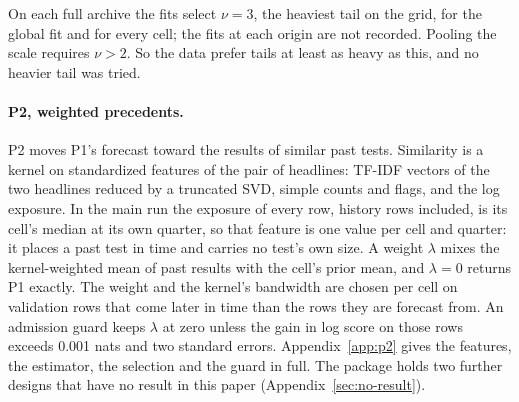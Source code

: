 \documentclass[sigconf,nonacm]{acmart}
\begin{document}
On each full archive the fits select $\nu = 3$, the heaviest tail on the grid, for the global fit and for every cell; the fits at each origin are not recorded. Pooling the scale requires $\nu > 2$. So the data prefer tails at least as heavy as this, and no heavier tail was tried.

\paragraph{P2, weighted precedents.} P2 moves P1's forecast toward the results of similar past tests. Similarity is a kernel on standardized features of the pair of headlines: TF-IDF vectors of the two headlines reduced by a truncated SVD, simple counts and flags, and the log exposure. In the main run the exposure of every row, history rows included, is its cell's median at its own quarter, so that feature is one value per cell and quarter: it places a past test in time and carries no test's own size. A weight $\lambda$ mixes the kernel-weighted mean of past results with the cell's prior mean, and $\lambda = 0$ returns P1 exactly. The weight and the kernel's bandwidth are chosen per cell on validation rows that come later in time than the rows they are forecast from. An admission guard keeps $\lambda$ at zero unless the gain in log score on those rows exceeds 0.001 nats and two standard errors. Appendix~\ref{app:p2} gives the features, the estimator, the selection and the guard in full. The package holds two further designs that have no result in this paper (Appendix~\ref{sec:no-result}).


\end{document}
